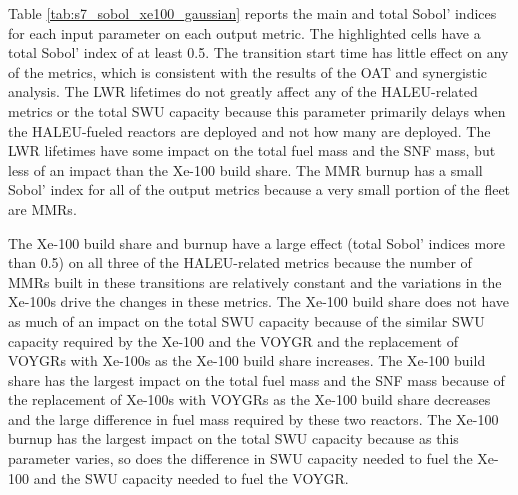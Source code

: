 Table \ref{tab:s7_sobol_xe100_gaussian} reports the main and total Sobol' indices 
for each input parameter on each output metric. The highlighted cells have 
a total Sobol' index of at least 0.5. 
The transition start time 
has little effect on any of the metrics, which is consistent with the 
results of the \gls{OAT} and synergistic analysis. The \gls{LWR} lifetimes 
do not greatly affect any of the \gls{HALEU}-related metrics or the 
total \gls{SWU} capacity because this parameter primarily delays when 
the \gls{HALEU}-fueled reactors are deployed and not how many are deployed. 
The \gls{LWR} lifetimes have some impact on the total 
fuel mass and the \gls{SNF} mass, but less of an impact than the Xe-100 
build share. 
The \gls{MMR} burnup has a small Sobol' index for all of the output metrics
because a very small portion of the fleet are \glspl{MMR}. 

The Xe-100 build share and burnup have a large effect (total Sobol' indices 
more than 0.5) on all three of the \gls{HALEU}-related metrics because the 
number of \glspl{MMR} built in these transitions are relatively constant and the 
variations in the Xe-100s drive the changes in these metrics. The Xe-100 build share 
does not have as much of an impact on the total \gls{SWU} capacity because 
of the similar \gls{SWU} capacity required by the Xe-100 and the VOYGR and 
the replacement of VOYGRs with Xe-100s as the Xe-100 build share increases. 
The Xe-100 build share has the largest impact on the total fuel mass 
and the \gls{SNF} mass because 
of the replacement of Xe-100s with VOYGRs as the Xe-100 build share decreases and 
the large difference in fuel mass required by these two reactors. The Xe-100 
burnup has the largest impact on the total \gls{SWU} capacity because as this 
parameter varies, so does the difference in \gls{SWU} capacity needed to fuel the Xe-100 
and the \gls{SWU} capacity needed to fuel the VOYGR.

